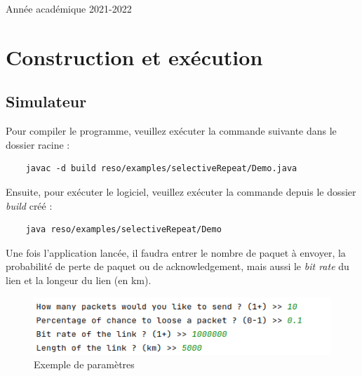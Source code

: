 \documentclass{article}
\begin{document}
\begin{titlepage}
\begin{center}
        {\large Année académique 2021-2022}
        
    \end{center}
\end{titlepage}

\newpage

\section{Construction et exécution}
\subsection{Simulateur}
Pour compiler le programme, veuillez exécuter la commande suivante dans le dossier racine :
\begin{verbatim}
    javac -d build reso/examples/selectiveRepeat/Demo.java
\end{verbatim}
Ensuite, pour exécuter le logiciel, veuillez exécuter la commande depuis le dossier \textit{build} créé :
\begin{verbatim}
    java reso/examples/selectiveRepeat/Demo
\end{verbatim}
Une fois l'application lancée, il faudra entrer le nombre de paquet à envoyer, la probabilité de perte
de paquet ou de acknowledgement, mais aussi le \textit{bit rate} du lien et la longeur du lien (en km).
\begin{figure}[h]
    \centering \includegraphics[scale=0.5]{data.png}
    \caption{Exemple de paramètres}
\end{figure}
\end{document}
